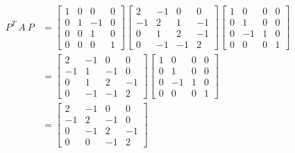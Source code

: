 \begin{example}
\begin{equation*}
\begin{split}
P^{T}~A~P & = \begin{bmatrix}
                1 &  0  &  0 & 0\\
                0 &  1  & -1 & 0\\
                0 &  0  &  1 & 0 \\
                0 &  0  &  0 & 1
             \end{bmatrix}
             \begin{bmatrix}
                2 & -1  &  0 &  0\\
               -1 &  2  &  1 & -1\\
                0 &  1  &  2 & -1 \\
                0 & -1  & -1 &  2
           \end{bmatrix}
           \begin{bmatrix}
                1 &  0  & 0 & 0\\
                0 &  1  & 0 & 0\\
                0 & -1  & 1 & 0 \\
                0 &  0  & 0 & 1
            \end{bmatrix}\\
 & = \begin{bmatrix}
                2 & -1  &  0 &   0\\
               -1 &  1  & -1 &   0\\
                0 &  1  &  2 &  -1 \\
                0 & -1  & -1 &   2
           \end{bmatrix}
           \begin{bmatrix}
                1 &  0  & 0 & 0\\
                0 &  1  & 0 & 0\\
                0 & -1  & 1 & 0 \\
                0 &  0  & 0 & 1
            \end{bmatrix}\\
 & = \begin{bmatrix}
                2 & -1  &   0   &   0\\
               -1 &  2  &  -1  &   0\\
                0 & -1  &   2  &  -1 \\
                0 &  0  &  -1  &   2
           \end{bmatrix}
\end{split}
\end{equation*}


\end{example}

